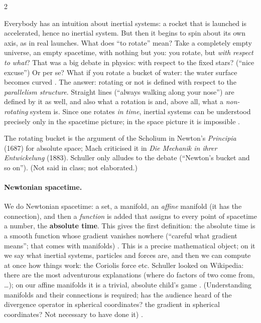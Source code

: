 \begin{paracol}{2}
\begin{example}\label{ex:bv-rocket}
Everybody has an intuition about inertial systems: a rocket that is launched is accelerated, hence no inertial system.
But then it begins to spin about its own axis, as in real launches. What does ``to rotate'' mean? Take a completely
empty universe, an empty spacetime, with nothing but you: you rotate, but \emph{with respect to what}? That was
a big debate in physics: with respect to the fixed stars? (``nice excuse'') Or per se? What if you rotate a bucket of
water: the water surface becomes curved .
The answer: rotating or not is defined with respect to the \emph{parallelism structure}. Straight lines (``always
walking along your nose'') are defined by it as well, and also what a rotation is and, above all, what a
\emph{non-rotating} system is. Since one rotates \emph{in time}, inertial systems can be understood precisely only in
the spacetime picture; in the space picture it is impossible .
\end{example}
\begin{history}
The rotating bucket is the argument of the Scholium in Newton's \emph{Principia} (1687) for absolute space; Mach criticised
it in \emph{Die Mechanik in ihrer Entwickelung} (1883). Schuller only alludes to the debate (``Newton's bucket and so on'').
(Not said in class; not elaborated.)
\end{history}

\paragraph{Newtonian spacetime.} We do Newtonian spacetime: a set, a manifold, an \emph{affine} manifold (it has the
connection), and then a \emph{function} is added that assigns to every point of spacetime a number, the
\textbf{absolute time}. This gives the first definition: the absolute time is a smooth function whose gradient vanishes
nowhere (``careful what gradient means''; that comes with manifolds) .
This is a precise mathematical object; on it we say what inertial systems, particles and forces are, and then we can
compute at once how things work: the Coriolis force etc. Schuller looked on Wikipedia: there are the most adventurous
explanations (where do factors of two come from, \dots); on our affine manifolds it is a trivial, absolute child's game
. (Understanding manifolds and their connections is required; has the audience
heard of the divergence operator in spherical coordinates? the gradient in spherical coordinates? Not necessary to have
done it) .


\end{paracol}
